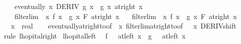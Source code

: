 \begin{isabellebody}
\ \ \ \ eventually\ {\isacharparenleft}{\kern0pt}{\isasymlambda}x{\isachardot}{\kern0pt}\ DERIV\ g\ x\ {\isacharcolon}{\kern0pt}{\isachargreater}{\kern0pt}\ g{\isacharprime}{\kern0pt}\ x{\isacharparenright}{\kern0pt}\ {\isacharparenleft}{\kern0pt}at{\isacharunderscore}{\kern0pt}right\ x{\isacharparenright}{\kern0pt}\ {\isasymLongrightarrow}\isanewline
\ \ \ \ filterlim\ {\isacharparenleft}{\kern0pt}{\isasymlambda}\ x{\isachardot}{\kern0pt}\ {\isacharparenleft}{\kern0pt}f{\isacharprime}{\kern0pt}\ x\ {\isacharslash}{\kern0pt}\ g{\isacharprime}{\kern0pt}\ x{\isacharparenright}{\kern0pt}{\isacharparenright}{\kern0pt}\ F\ {\isacharparenleft}{\kern0pt}at{\isacharunderscore}{\kern0pt}right\ x{\isacharparenright}{\kern0pt}\ {\isasymLongrightarrow}\isanewline
\ \ filterlim\ {\isacharparenleft}{\kern0pt}{\isasymlambda}\ x{\isachardot}{\kern0pt}\ f\ x\ {\isacharslash}{\kern0pt}\ g\ x{\isacharparenright}{\kern0pt}\ F\ {\isacharparenleft}{\kern0pt}at{\isacharunderscore}{\kern0pt}right\ x{\isacharparenright}{\kern0pt}{\isachardoublequoteclose}\isanewline
\ \ \ x\ {\isacharcolon}{\kern0pt}{\isacharcolon}{\kern0pt}\ real\isanewline
%
\isadelimproof
\ \ %
\endisadelimproof
%
\isatagproof
{}\isamarkupfalse%
\ eventually{\isacharunderscore}{\kern0pt}at{\isacharunderscore}{\kern0pt}right{\isacharunderscore}{\kern0pt}to{\isacharunderscore}{\kern0pt}{}{\isacharbrackleft}{\kern0pt}of\ {\isacharunderscore}{\kern0pt}\ x{\isacharbrackright}{\kern0pt}\ filterlim{\isacharunderscore}{\kern0pt}at{\isacharunderscore}{\kern0pt}right{\isacharunderscore}{\kern0pt}to{\isacharunderscore}{\kern0pt}{}{\isacharbrackleft}{\kern0pt}of\ {\isacharunderscore}{\kern0pt}\ {\isacharunderscore}{\kern0pt}\ x{\isacharbrackright}{\kern0pt}\ DERIV{\isacharunderscore}{\kern0pt}shift\isanewline
\ \ \isamarkupfalse%
\ {\isacharparenleft}{\kern0pt}rule\ lhopital{\isacharunderscore}{\kern0pt}right{\isacharunderscore}{\kern0pt}{}{\isacharparenright}{\kern0pt}%
\endisatagproof
{\isafoldproof}%
%
\isadelimproof
\isanewline
%
\endisadelimproof
\isanewline
{}\isamarkupfalse%
\ lhopital{\isacharunderscore}{\kern0pt}left{\isacharcolon}{\kern0pt}\isanewline
\ \ {\isachardoublequoteopen}{\isacharparenleft}{\kern0pt}f\ {\isasymlonglongrightarrow}\ {}{\isacharparenright}{\kern0pt}\ {\isacharparenleft}{\kern0pt}at{\isacharunderscore}{\kern0pt}left\ x{\isacharparenright}{\kern0pt}\ {\isasymLongrightarrow}\ {\isacharparenleft}{\kern0pt}g\ {\isasymlonglongrightarrow}\ {}{\isacharparenright}{\kern0pt}\ {\isacharparenleft}{\kern0pt}at{\isacharunderscore}{\kern0pt}left\ x{\isacharparenright}{\kern0pt}\ {\isasymLongrightarrow}\isanewline

\end{isabellebody}
